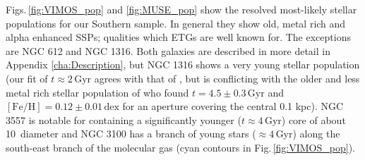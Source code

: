 		Figs.\,\ref{fig:VIMOS_pop} and \ref{fig:MUSE_pop} show the resolved most-likely stellar populations for our Southern sample. In general they show old, metal rich and alpha enhanced SSPs; qualities which ETGs are well known for. The exceptions are NGC 612 and NGC 1316. Both galaxies are described in more detail in Appendix \ref{cha:Description}, but NGC 1316 shows a very young stellar population (our fit of $t \approx 2$\,Gyr agrees with that of \citealt{Kuntschner2000}, but is conflicting with the older and less metal rich stellar population of \citealt{Koleva2011} who found $t=4.5 \pm 0.3 \,\mathrm{Gyr}$ and $\mathrm{[Fe/H]}=0.12 \pm 0.01 \,\mathrm{dex}$ for an aperture covering the central 0.1 kpc). NGC 3557 is notable for containing a significantly younger ($t\approx 4$\,Gyr) core of about 10\arcsec\ diameter and NGC 3100 has a branch of young stars ($\approx 4$\,Gyr) along the south-east branch of the molecular gas (cyan contours in Fig.\,\ref{fig:VIMOS_pop}).

